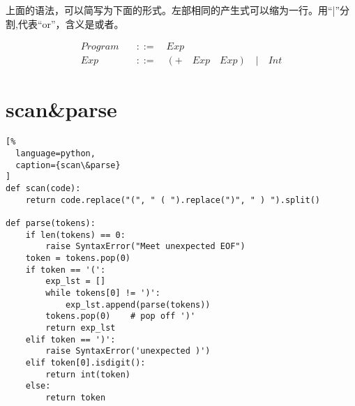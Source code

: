 上面的语法，可以简写为下面的形式。左部相同的产生式可以缩为一行。用“|”分割,代表“or”，含义是或者。

\begin{equation}
\begin{aligned}
  \label{eq:2}
   Program \quad &::= \quad Exp \\
   Exp \quad &::= \quad (+ \quad Exp \quad Exp) \quad | \quad Int
\end{aligned}
\end{equation}



\section{scan\&parse}

\begin{lstlisting}[%
  language=python,
  caption={scan\&parse}
]
def scan(code):
    return code.replace("(", " ( ").replace(")", " ) ").split()

def parse(tokens):
    if len(tokens) == 0:
        raise SyntaxError("Meet unexpected EOF")
    token = tokens.pop(0)
    if token == '(':
        exp_lst = []
        while tokens[0] != ')':
            exp_lst.append(parse(tokens))
        tokens.pop(0)    # pop off ')'
        return exp_lst
    elif token == ')':
        raise SyntaxError('unexpected )')
    elif token[0].isdigit():
        return int(token)
    else:
        return token
\end{lstlisting}